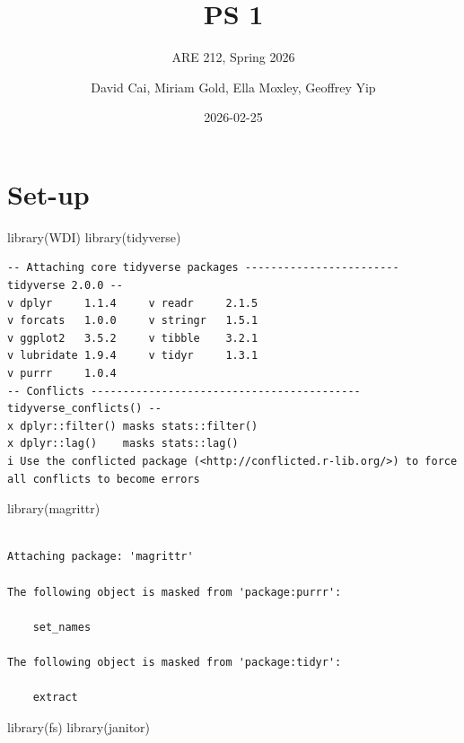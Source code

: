 \documentclass[
  letterpaper,
  DIV=11,
  numbers=noendperiod]{scrartcl}
\title{PS 1}
\subtitle{ARE 212, Spring 2026}
\author{David Cai, Miriam Gold, Ella Moxley, Geoffrey Yip}
\date{2026-02-25}
\newenvironment{Shaded}{\begin{snugshade}}{\end{snugshade}}
\newcommand{\FunctionTok}[1]{\textcolor[rgb]{0.28,0.35,0.67}{#1}}
\newcommand{\NormalTok}[1]{\textcolor[rgb]{0.00,0.23,0.31}{#1}}
\begin{document}
\maketitle


\section{Set-up}\label{set-up}

\begin{Shaded}
\begin{Highlighting}[]
\FunctionTok{library}\NormalTok{(WDI)}
\FunctionTok{library}\NormalTok{(tidyverse)}
\end{Highlighting}
\end{Shaded}

\begin{verbatim}
-- Attaching core tidyverse packages ------------------------ tidyverse 2.0.0 --
v dplyr     1.1.4     v readr     2.1.5
v forcats   1.0.0     v stringr   1.5.1
v ggplot2   3.5.2     v tibble    3.2.1
v lubridate 1.9.4     v tidyr     1.3.1
v purrr     1.0.4     
-- Conflicts ------------------------------------------ tidyverse_conflicts() --
x dplyr::filter() masks stats::filter()
x dplyr::lag()    masks stats::lag()
i Use the conflicted package (<http://conflicted.r-lib.org/>) to force all conflicts to become errors
\end{verbatim}

\begin{Shaded}
\begin{Highlighting}[]
\FunctionTok{library}\NormalTok{(magrittr)}
\end{Highlighting}
\end{Shaded}

\begin{verbatim}

Attaching package: 'magrittr'

The following object is masked from 'package:purrr':

    set_names

The following object is masked from 'package:tidyr':

    extract
\end{verbatim}

\begin{Shaded}
\begin{Highlighting}[]
\FunctionTok{library}\NormalTok{(fs)}
\FunctionTok{library}\NormalTok{(janitor)}
\end{Highlighting}
\end{Shaded}
\end{document}
